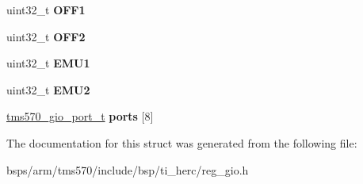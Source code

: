 \begin{DoxyCompactItemize}
\mbox{\label{structtms570__gio__t_a84954ca7b2ef79c44234b355a0294d06}} 
uint32\+\_\+t {\bfseries O\+F\+F1}
\item 
\mbox{\label{structtms570__gio__t_a216efb3141dd9d4776371ed52ee3900c}} 
uint32\+\_\+t {\bfseries O\+F\+F2}
\item 
\mbox{\label{structtms570__gio__t_a6d382aa0f61b09dfb03515ded092e37f}} 
uint32\+\_\+t {\bfseries E\+M\+U1}
\item 
\mbox{\label{structtms570__gio__t_a517c74a9fd4e5d269daf3c273f86eca5}} 
uint32\+\_\+t {\bfseries E\+M\+U2}
\item 
\mbox{\label{structtms570__gio__t_aee6bc48b800b410a59a689c2adcf4d20}} 
\mbox{\hyperlink{structtms570__gio__port__t}{tms570\+\_\+gio\+\_\+port\+\_\+t}} {\bfseries ports} \mbox{[}8\mbox{]}
\end{DoxyCompactItemize}


The documentation for this struct was generated from the following file\+:\begin{DoxyCompactItemize}
\item 
bsps/arm/tms570/include/bsp/ti\+\_\+herc/reg\+\_\+gio.\+h\end{DoxyCompactItemize}

